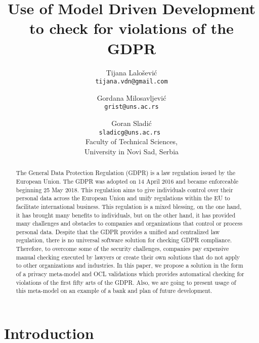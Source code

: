 \documentclass[11pt,english]{article}
\begin{document}
\title{Use of Model Driven Development to check for violations of the GDPR}
\author{
  Tijana Lalošević\\
  \texttt{tijana.vdn@gmail.com}
  \and
  Gordana Milosavljević\\
  \texttt{grist@uns.ac.rs}
  \and
  Goran Sladić\\
  \texttt{sladicg@uns.ac.rs }
  \\Faculty of Technical Sciences,\\ University in Novi Sad, Serbia
}


\date{}
\maketitle


\begin{abstract}
The General Data Protection Regulation (GDPR) is a law regulation issued by the European Union. The GDPR was adopted on 14 April 2016 and became enforceable beginning 25 May 2018. This regulation aims to give individuals control over their personal data across the European Union and unify regulations within the EU to facilitate international business. This regulation is a mixed blessing, on the one hand, it has brought many benefits to individuals, but on the other hand, it has provided many challenges and obstacles to companies and organizations that control or process personal data. Despite that the GDPR provides a unified and centralized law regulation, there is no universal software solution for checking GDPR compliance. Therefore, to overcome some of the security challenges, companies pay expensive manual checking executed by lawyers or create their own solutions that do not apply to other organizations and industries. In this paper, we propose a solution in the form of a privacy meta-model and OCL validations which provides automatical checking for violations of the first fifty arts of the GDPR. Also, we are going to present usage of this meta-model on an example of a bank and plan of future development.
\end{abstract}

\section{Introduction}
\end{document}

